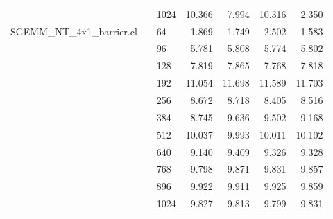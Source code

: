 \begin{tabular}{lllrrrr}
                &        & 1024 &  10.366 &   7.994 &  10.316 &   2.350 \\
SGEMM\_NT\_4x1\_barrier.cl &        & 64   &   1.869 &   1.749 &   2.502 &   1.583 \\
                &        & 96   &   5.781 &   5.808 &   5.774 &   5.802 \\
                &        & 128  &   7.819 &   7.865 &   7.768 &   7.818 \\
                &        & 192  &  11.054 &  11.698 &  11.589 &  11.703 \\
                &        & 256  &   8.672 &   8.718 &   8.405 &   8.516 \\
                &        & 384  &   8.745 &   9.636 &   9.502 &   9.168 \\
                &        & 512  &  10.037 &   9.993 &  10.011 &  10.102 \\
                &        & 640  &   9.140 &   9.409 &   9.326 &   9.328 \\
                &        & 768  &   9.798 &   9.871 &   9.831 &   9.857 \\
                &        & 896  &   9.922 &   9.911 &   9.925 &   9.859 \\
                &        & 1024 &   9.827 &   9.813 &   9.799 &   9.831 \\
\bottomrule
\end{tabular}

